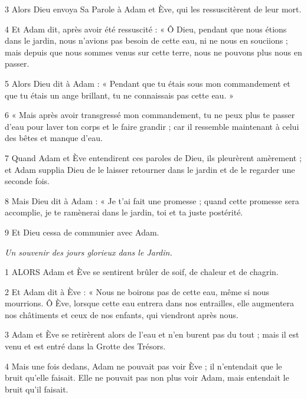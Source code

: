 \par 3 Alors Dieu envoya Sa Parole à Adam et Ève, qui les ressuscitèrent de leur mort.

\par 4 Et Adam dit, après avoir été ressuscité : « Ô Dieu, pendant que nous étions dans le jardin, nous n'avions pas besoin de cette eau, ni ne nous en souciions ; mais depuis que nous sommes venus sur cette terre, nous ne pouvons plus nous en passer.

\par 5 Alors Dieu dit à Adam : « Pendant que tu étais sous mon commandement et que tu étais un ange brillant, tu ne connaissais pas cette eau. »

\par 6 « Mais après avoir transgressé mon commandement, tu ne peux plus te passer d'eau pour laver ton corps et le faire grandir ; car il ressemble maintenant à celui des bêtes et manque d’eau.

\par 7 Quand Adam et Ève entendirent ces paroles de Dieu, ils pleurèrent amèrement ; et Adam supplia Dieu de le laisser retourner dans le jardin et de le regarder une seconde fois.

\par 8 Mais Dieu dit à Adam : « Je t'ai fait une promesse ; quand cette promesse sera accomplie, je te ramènerai dans le jardin, toi et ta juste postérité.

\par 9 Et Dieu cessa de communier avec Adam.


\par \textit{Un souvenir des jours glorieux dans le Jardin.}

\par 1 ALORS Adam et Ève se sentirent brûler de soif, de chaleur et de chagrin.

\par 2 Et Adam dit à Ève : « Nous ne boirons pas de cette eau, même si nous mourrions. Ô Ève, lorsque cette eau entrera dans nos entrailles, elle augmentera nos châtiments et ceux de nos enfants, qui viendront après nous.

\par 3 Adam et Ève se retirèrent alors de l'eau et n'en burent pas du tout ; mais il est venu et est entré dans la Grotte des Trésors.

\par 4 Mais une fois dedans, Adam ne pouvait pas voir Ève ; il n'entendait que le bruit qu'elle faisait. Elle ne pouvait pas non plus voir Adam, mais entendait le bruit qu'il faisait.

